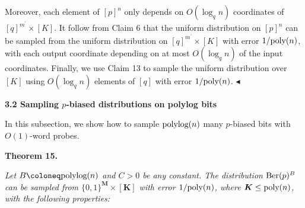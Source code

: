 \documentclass[10pt,a4paper]{article}
\begin{document}
Moreover, each element of $[p]^{n}$ only depends on $O(\log_{q}n)$ coordinates of $[q]^{m^{\prime}}\times[K]$.
It follow from Claim 6 that the uniform distribution on $[p]^{n}$ can be sampled from the uniform distribution on $[q]^{m^{\prime}}\times[K]$ with error $1/\textnormal{poly}(n)$, with each output coordinate depending on at most $O(\log_{q}n)$ of the input coordinates.
Finally, we use Claim 13 to sample the uniform distribution over $[K]$ using $O(\log_{q}n)$ elements of $[q]$ with error $1/\textnormal{poly}(n)$.
$\blacktriangleleft$\par






\par\medskip\noindent\textbf{
3.2 Sampling $p$-biased distributions on polylog bits}\par




In this subsection, we show how to sample $\textnormal{polylog}(n)$ many $p$-biased bits with $O(1)$-word probes.\par





\par\medskip\noindent\textbf{
\textbf{Theorem 15}\textbf{.}
}\par



\emph{Let $B\coloneq\textnormal{polylog}(n)$ and $C>0$ be any constant.
The distribution $\textnormal{Ber}(p)^{B}$ can be sampled from $\{0,1\}^{\boldsymbol{M}}\times[\boldsymbol{K}]$ with error $1/\textnormal{poly}(n)$, where $\boldsymbol{K}\leq\textnormal{poly}(n)$, with the following properties:}\par
\end{document}
